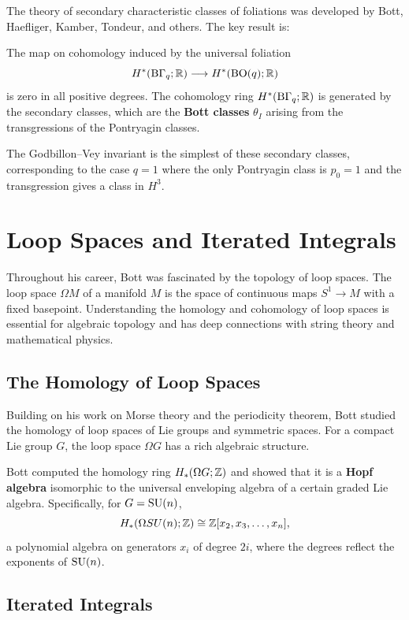 The theory of secondary characteristic classes of foliations was developed by Bott, Haefliger, Kamber, Tondeur, and others. The key result is:

\begin{theorem}
The map on cohomology induced by the universal foliation
\[
H^*(\operatorname{B\Gamma}_q; \mathbb{R}) \longrightarrow H^*(\operatorname{BO}(q); \mathbb{R})
\]
is zero in all positive degrees. The cohomology ring \(H^*(\operatorname{B\Gamma}_q; \mathbb{R})\) is generated by the secondary classes, which are the \textbf{Bott classes} \(\theta_I\) arising from the transgressions of the Pontryagin classes.
\end{theorem}

The Godbillon--Vey invariant is the simplest of these secondary classes, corresponding to the case \(q = 1\) where the only Pontryagin class is \(p_0 = 1\) and the transgression gives a class in \(H^3\).

\section{Loop Spaces and Iterated Integrals}

Throughout his career, Bott was fascinated by the topology of loop spaces. The loop space \(\Omega M\) of a manifold \(M\) is the space of continuous maps \(S^1 \to M\) with a fixed basepoint. Understanding the homology and cohomology of loop spaces is essential for algebraic topology and has deep connections with string theory and mathematical physics.

\subsection{The Homology of Loop Spaces}

Building on his work on Morse theory and the periodicity theorem, Bott studied the homology of loop spaces of Lie groups and symmetric spaces. For a compact Lie group \(G\), the loop space \(\Omega G\) has a rich algebraic structure.

Bott computed the homology ring \(H_*(\Omega G; \mathbb{Z})\) and showed that it is a \textbf{Hopf algebra} isomorphic to the universal enveloping algebra of a certain graded Lie algebra. Specifically, for \(G = \operatorname{SU}(n)\),
\[
H_*(\Omega SU(n); \mathbb{Z}) \cong \mathbb{Z}[x_2, x_3, \dots, x_n],
\]
a polynomial algebra on generators \(x_i\) of degree \(2i\), where the degrees reflect the exponents of \(\operatorname{SU}(n)\).

\subsection{Iterated Integrals}

